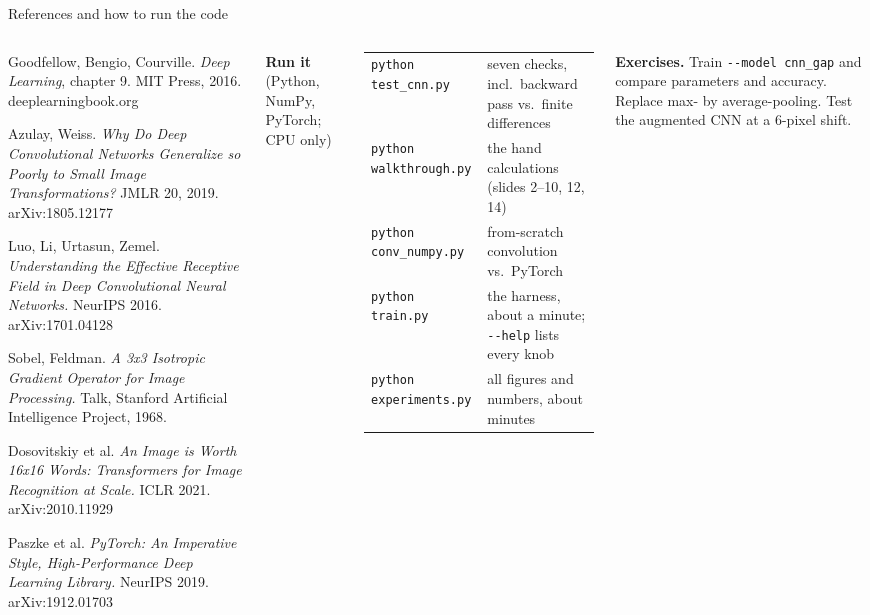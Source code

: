 \documentclass[aspectratio=169,10pt]{beamer}
\begin{document}
\begin{frame}{References and how to run the code}
\begin{columns}[T,onlytextwidth]
\begin{enumerate}[{[1]}]
\item Goodfellow, Bengio, Courville. \emph{Deep Learning}, chapter 9. MIT Press, 2016. deeplearningbook.org
\item Azulay, Weiss. \emph{Why Do Deep Convolutional Networks Generalize so Poorly to Small Image Transformations?} JMLR 20, 2019. arXiv:1805.12177
\item Luo, Li, Urtasun, Zemel. \emph{Understanding the Effective Receptive Field in Deep Convolutional Neural Networks.} NeurIPS 2016. arXiv:1701.04128
\item Sobel, Feldman. \emph{A 3x3 Isotropic Gradient Operator for Image Processing.} Talk, Stanford Artificial Intelligence Project, 1968.
\item Dosovitskiy et al. \emph{An Image is Worth 16x16 Words: Transformers for Image Recognition at Scale.} ICLR 2021. arXiv:2010.11929
\item Paszke et al. \emph{PyTorch: An Imperative Style, High-Performance Deep Learning Library.} NeurIPS 2019. arXiv:1912.01703
\end{enumerate}

\vspace{0.5mm}
{\fontsize{6.5}{7.9}\selectfont\color{cInk}
\textbf{Run it} (Python, NumPy, PyTorch; CPU only)

\vspace{0.5mm}
\begin{tabular}{@{}l>{\raggedright\arraybackslash}p{52mm}@{}}
\texttt{python test\_cnn.py} & seven checks, incl.\ backward pass vs.\ finite differences\\
\texttt{python walkthrough.py} & the hand calculations (slides 2--10, 12, 14)\\
\texttt{python conv\_numpy.py} & from-scratch convolution vs.\ PyTorch\\
\texttt{python train.py} & the harness, about a minute; \texttt{-{}-help} lists every knob\\
\texttt{python experiments.py} & all figures and numbers, about \totalMinutes{} minutes\\
\end{tabular}

\vspace{0.6mm}
\textbf{Exercises.} Train \texttt{-{}-model cnn\_gap} and compare parameters and accuracy.
Replace max- by average-pooling. Test the augmented CNN at a 6-pixel shift.}
\end{columns}
\end{frame}
\end{document}
